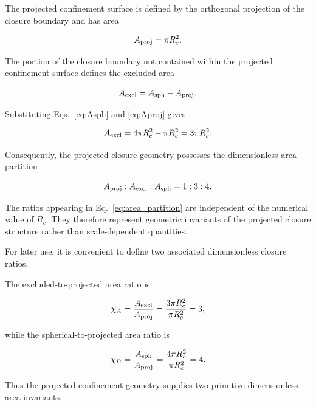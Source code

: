 \documentclass[11pt]{article}
\theoremstyle{definition}
\theoremstyle{remark}
\begin{document}
The projected confinement surface is defined by the orthogonal
projection of the closure boundary and has area

\begin{equation}
A_{\rm proj} = \pi R_c^2.
\label{eq:Aproj}
\end{equation}

The portion of the closure boundary not contained within the
projected confinement surface defines the excluded area

\begin{equation}
A_{\rm excl}
=
A_{\rm sph}
-
A_{\rm proj}.
\label{eq:Aexcl_def}
\end{equation}

Substituting
Eqs.~\eqref{eq:Asph} and \eqref{eq:Aproj} gives

\begin{equation}
A_{\rm excl}
=
4\pi R_c^2
-
\pi R_c^2
=
3\pi R_c^2.
\label{eq:Aexcl}
\end{equation}

Consequently, the projected closure geometry possesses the
dimensionless area partition

\begin{equation}
A_{\rm proj} : A_{\rm excl} : A_{\rm sph} = 1 : 3 : 4.
\label{eq:area_partition}
\end{equation}

The ratios appearing in
Eq.~\eqref{eq:area_partition} are independent of the numerical
value of \(R_c\). They therefore represent geometric invariants
of the projected closure structure rather than scale-dependent
quantities.

For later use, it is convenient to define two associated
dimensionless closure ratios.

The excluded-to-projected area ratio is

\begin{equation}
\chi_A = \frac{A_{\rm excl}}
{A_{\rm proj}} = \frac{3\pi R_c^2}
{\pi R_c^2} = 3,
\label{eq:chiA}
\end{equation}

while the spherical-to-projected area ratio is

\begin{equation}
\chi_B = \frac{A_{\rm sph}}{A_{\rm proj}} = \frac{4\pi R_c^2}
{\pi R_c^2} = 4.
\label{eq:chiB}
\end{equation}

Thus the projected confinement geometry supplies two primitive
dimensionless area invariants,
\end{document}
